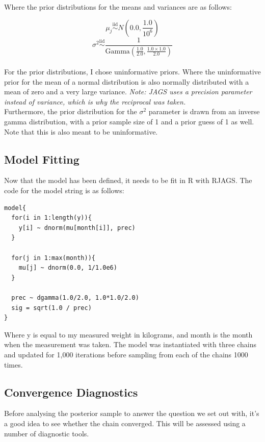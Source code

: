 \documentclass[journal, a4paper]{IEEEtran}
\begin{document}
Where the prior distributions for the means and variances are as follows:

$$\mu_j \overset{\text{iid}}{\sim} N\left(0.0, \frac{1.0}{10^6}\right)$$
$$\sigma^2 \overset{\text{iid}}{\sim} \frac{1}{\textrm{Gamma}(\frac{1.0}{2.0}, \frac{1.0 \times 1.0}{2.0})} $$\\

For the prior distributions, I chose uninformative priors. Where the uninformative prior for the mean of a normal distribution is also normally distributed with
a mean of zero and a very large variance. \textit{Note: JAGS uses a precision parameter instead of variance, which is why the reciprocal was taken.}\\

Furthermore, the prior distribution for the $\sigma^2$ parameter is drawn from an inverse gamma distribution, with a prior sample size of 1 and a prior guess of
1 as well. Note that this is also meant to be uninformative.

\subsection{Model Fitting}

Now that the model has been defined, it needs to be fit in R with RJAGS. The code for the model string is as follows:\\

\begin{lstlisting}
model{
  for(i in 1:length(y)){
    y[i] ~ dnorm(mu[month[i]], prec)
  }
  
  for(j in 1:max(month)){
    mu[j] ~ dnorm(0.0, 1/1.0e6)
  }
  
  prec ~ dgamma(1.0/2.0, 1.0*1.0/2.0)
  sig = sqrt(1.0 / prec)
}
\end{lstlisting}

Where y is equal to my measured weight in kilograms, and month is the month when the measurement was taken. The model was instantiated with three chains and 
updated for 1,000 iterations before sampling from each of the chains 1000 times.

\subsection{Convergence Diagnostics}

Before analysing the posterior sample to answer the question we set out with, it's a good idea to see whether the chain converged. This will be assessed using
a number of diagnostic tools.\\
\end{document}
